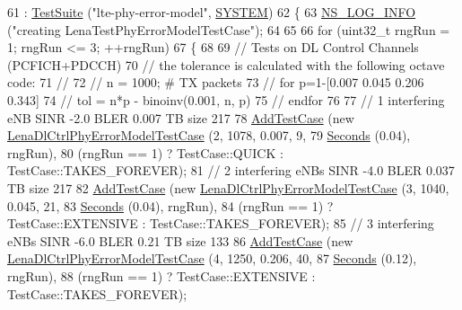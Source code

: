 \begin{DoxyCode}
61   : \hyperlink{classns3_1_1TestSuite_a904b0c40583b744d30908aeb94636d1a}{TestSuite} (\textcolor{stringliteral}{"lte-phy-error-model"}, \hyperlink{classns3_1_1TestSuite_a1ebfcab34ec8161e085e8e3a1855eae0a90c5529a26ab3a5ffcc6e57040dbd82e}{SYSTEM})
62 \{
63   \hyperlink{group__logging_gafbd73ee2cf9f26b319f49086d8e860fb}{NS\_LOG\_INFO} (\textcolor{stringliteral}{"creating LenaTestPhyErrorModelTestCase"});
64   
65   
66   \textcolor{keywordflow}{for} (uint32\_t rngRun = 1; rngRun <= 3; ++rngRun)
67     \{
68 
69       \textcolor{comment}{// Tests on DL Control Channels (PCFICH+PDCCH)}
70       \textcolor{comment}{// the tolerance is calculated with the following octave code:}
71       \textcolor{comment}{//}
72       \textcolor{comment}{// n =  1000; # TX packets}
73       \textcolor{comment}{// for p=1-[0.007 0.045 0.206 0.343]}
74       \textcolor{comment}{//    tol = n*p - binoinv(0.001, n, p)}
75       \textcolor{comment}{// endfor}
76 
77       \textcolor{comment}{// 1 interfering eNB SINR -2.0 BLER 0.007 TB size 217}
78       \hyperlink{classns3_1_1TestCase_a3718088e3eefd5d6454569d2e0ddd835}{AddTestCase} (\textcolor{keyword}{new} \hyperlink{classLenaDlCtrlPhyErrorModelTestCase}{LenaDlCtrlPhyErrorModelTestCase} (2, 1078, 
      0.007, 9,
79                                                         \hyperlink{group__timecivil_ga33c34b816f8ff6628e33d5c8e9713b9e}{Seconds} (0.04), rngRun),
80                    (rngRun == 1) ? TestCase::QUICK : TestCase::TAKES\_FOREVER);
81       \textcolor{comment}{// 2 interfering eNBs SINR -4.0 BLER 0.037 TB size 217}
82       \hyperlink{classns3_1_1TestCase_a3718088e3eefd5d6454569d2e0ddd835}{AddTestCase} (\textcolor{keyword}{new} \hyperlink{classLenaDlCtrlPhyErrorModelTestCase}{LenaDlCtrlPhyErrorModelTestCase} (3, 1040, 
      0.045, 21,
83                                                         \hyperlink{group__timecivil_ga33c34b816f8ff6628e33d5c8e9713b9e}{Seconds} (0.04), rngRun),
84                    (rngRun == 1) ? TestCase::EXTENSIVE : TestCase::TAKES\_FOREVER);
85       \textcolor{comment}{// 3 interfering eNBs SINR -6.0 BLER 0.21 TB size 133}
86       \hyperlink{classns3_1_1TestCase_a3718088e3eefd5d6454569d2e0ddd835}{AddTestCase} (\textcolor{keyword}{new} \hyperlink{classLenaDlCtrlPhyErrorModelTestCase}{LenaDlCtrlPhyErrorModelTestCase} (4, 1250, 
      0.206, 40,
87                                                         \hyperlink{group__timecivil_ga33c34b816f8ff6628e33d5c8e9713b9e}{Seconds} (0.12), rngRun),
88                    (rngRun == 1) ? TestCase::EXTENSIVE : TestCase::TAKES\_FOREVER);

\end{DoxyCode}
